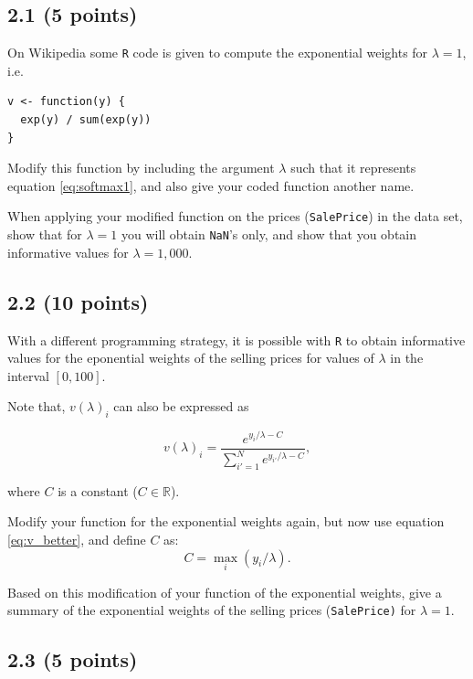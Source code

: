 \documentclass[]{article}
\begin{document}
\subsection{2.1 (5 points)}\label{points}

On Wikipedia some \texttt{R} code is given to compute the exponential
weights for \(\lambda = 1\), i.e.

\begin{verbatim}
v <- function(y) {
  exp(y) / sum(exp(y))
}
\end{verbatim}

Modify this function by including the argument \(\lambda\) such that it
represents equation \ref{eq:softmax1}, and also give your coded function
another name.

When applying your modified function on the prices (\texttt{SalePrice})
in the data set, show that for \(\lambda = 1\) you will obtain
\texttt{NaN}'s only, and show that you obtain informative values for
\(\lambda = 1,000\).

\subsection{2.2 (10 points)}\label{points-1}

With a different programming strategy, it is possible with \texttt{R} to
obtain informative values for the eponential weights of the selling
prices for values of \(\lambda\) in the interval \([0, 100]\).

Note that, \(v(\lambda)_i\) can also be expressed as

\begin{equation} \label{eq:v_better}
v(\lambda)_i = \frac{e^{y_i / \lambda - C}}{\sum_{i' = 1}^N e^{y_{i'} / \lambda - C }},
\end{equation}

where \(C\) is a constant (\(C \in \mathbb{R}\)).

Modify your function for the exponential weights again, but now use
equation \eqref{eq:v_better}, and define \(C\) as:
\[C = \max_i \left( y_i / \lambda \right).\]

Based on this modification of your function of the exponential weights,
give a summary of the exponential weights of the selling prices
(\texttt{SalePrice)} for \(\lambda = 1\).

\subsection{2.3 (5 points)}\label{points-2}
\end{document}
